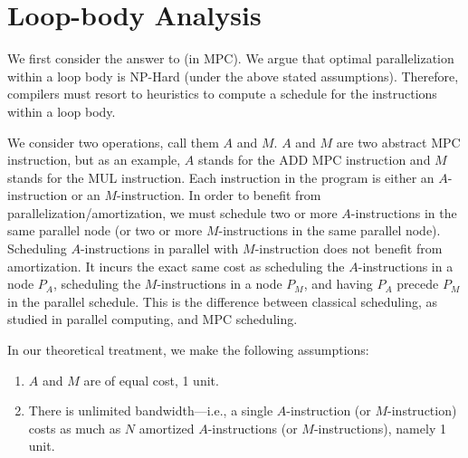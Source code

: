 \section{Loop-body Analysis}
\label{sec:loopbodyanalysis}

We first consider the answer to  (in MPC). 
We argue that optimal parallelization within a loop body is NP-Hard (under the above stated assumptions). 
Therefore, compilers must resort to heuristics to compute a schedule for the instructions within a loop body.

We consider two operations, call them $A$ and $M$. $A$ and $M$ are two abstract MPC instruction, 
but as an example, $A$ stands for the ADD MPC instruction 
and $M$ stands for the MUL instruction. Each instruction in the program is either an $A$-instruction or
an $M$-instruction. In order to benefit from parallelization/amortization, we must schedule two or more 
$A$-instructions in the same parallel node (or two or more $M$-instructions in the same parallel node). 
Scheduling $A$-instructions in parallel with $M$-instruction does not benefit from amortization.
It incurs the exact same cost as scheduling the $A$-instructions in a node $P_A$, scheduling the $M$-instructions 
in a node $P_M$, and having $P_A$ precede $P_M$ in the parallel schedule. This is the difference 
between classical scheduling, as studied in parallel computing, and MPC scheduling. 

In our theoretical treatment, we make the following assumptions:

\begin{enumerate}

\item $A$ and $M$ are of equal cost, 1 unit.
\item There is unlimited bandwidth---i.e., a single $A$-instruction (or $M$-instruction) costs as much as $N$ amortized $A$-instructions 
(or $M$-instructions), namely 1 unit.
 
\end{enumerate}


